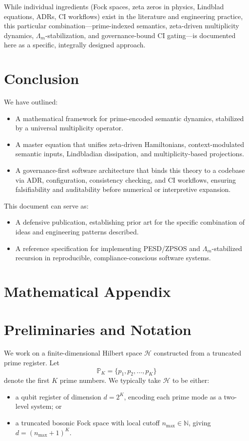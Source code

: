 \documentclass[11pt]{article}
\begin{document}
While individual ingredients (Fock spaces, zeta zeros in physics, Lindblad equations, ADRs, CI workflows) exist in the literature and engineering practice, this particular combination---prime-indexed semantics, zeta-driven multiplicity dynamics, \(\Lambda_m\)-stabilization, and governance-bound CI gating---is documented here as a specific, integrally designed approach.

\section{Conclusion}

We have outlined:

\begin{itemize}[nosep]
  \item A mathematical framework for prime-encoded semantic dynamics, stabilized by a universal multiplicity operator.
  \item A master equation that unifies zeta-driven Hamiltonians, context-modulated semantic inputs, Lindbladian dissipation, and multiplicity-based projections.
  \item A governance-first software architecture that binds this theory to a codebase via ADR, configuration, consistency checking, and CI workflows, ensuring falsifiability and auditability before numerical or interpretive expansion.
\end{itemize}

This document can serve as:
\begin{itemize}[nosep]
  \item A defensive publication, establishing prior art for the specific combination of ideas and engineering patterns described.
  \item A reference specification for implementing PESD/ZPSOS and \(\Lambda_m\)-stabilized recursion in reproducible, compliance-conscious software systems.
\end{itemize}

\appendix
\section*{Mathematical Appendix}

\section{Preliminaries and Notation}

We work on a finite-dimensional Hilbert space \(\mathcal{H}\) constructed from a truncated prime register. Let
\[
\mathbb{P}_K = \{p_1, p_2, \dots, p_K\}
\]
denote the first \(K\) prime numbers. We typically take \(\mathcal{H}\) to be either:
\begin{itemize}[nosep]
  \item a qubit register of dimension \(d = 2^K\), encoding each prime mode as a two-level system; or
  \item a truncated bosonic Fock space with local cutoff \(n_{\max} \in \mathbb{N}\), giving \(d = (n_{\max}+1)^K\).
\end{itemize}
\end{document}
